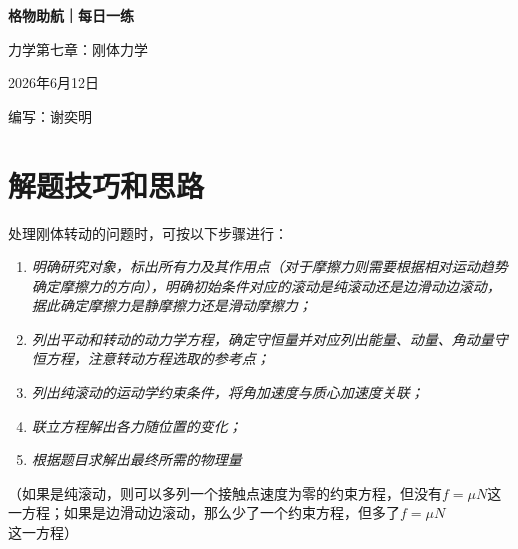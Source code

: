 \documentclass[11pt,a4paper]{ctexart}
\begin{document}
\begin{center}
  {\Large\bfseries\color{mainblue} 格物助航｜每日一练}\par
  \vspace{0.25em}
  {\large 力学第七章：刚体力学}\par
  \vspace{0.35em}
  {\small 2026年6月12日}\par
  \vspace{0.35em}
  {\small 编写：谢奕明}
\end{center}

\vspace{-0.3em}

\section*{解题技巧和思路}
\begin{tipBox}
处理刚体转动的问题时，可按以下步骤进行：
\begin{enumerate}
\item \textit{明确研究对象，标出所有力及其作用点（对于摩擦力则需要根据相对运动趋势确定摩擦力的方向），明确初始条件对应的滚动是纯滚动还是边滑动边滚动，据此确定摩擦力是静摩擦力还是滑动摩擦力；}
\item \textit{列出平动和转动的动力学方程，确定守恒量并对应列出能量、动量、角动量守恒方程，注意转动方程选取的参考点；}
\item \textit{列出纯滚动的运动学约束条件，将角加速度与质心加速度关联；}
\item \textit{联立方程解出各力随位置的变化；}
\item \textit{根据题目求解出最终所需的物理量}
\end{enumerate}
（如果是纯滚动，则可以多列一个接触点速度为零的约束方程，但没有$f  = \mu N$这一方程；如果是边滑动边滚动，那么少了一个约束方程，但多了$f = \mu N$这一方程）
\end{tipBox}
\end{document}
